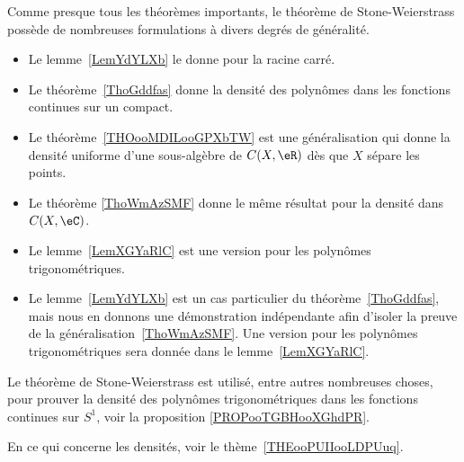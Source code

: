 Comme presque tous les théorèmes importants, le théorème de Stone-Weierstrass possède de nombreuses formulations à divers degrés de généralité.
\begin{itemize}
    \item Le lemme~\ref{LemYdYLXb} le donne pour la racine carré.
    \item Le théorème~\ref{ThoGddfas} donne la densité des polynômes dans les fonctions continues sur un compact.
    \item Le théorème~\ref{THOooMDILooGPXbTW} est une généralisation qui donne la densité uniforme d'une sous-algèbre de \( C(X,\eR)\) dès que \( X\) sépare les points.
    \item Le théorème \ref{ThoWmAzSMF} donne le même résultat pour la densité dans \( C(X,\eC)\).
    \item Le lemme~\ref{LemXGYaRlC} est une version pour les polynômes trigonométriques.
    \item
        Le lemme~\ref{LemYdYLXb} est un cas particulier du
        théorème~\ref{ThoGddfas}, mais nous en donnons une démonstration indépendante afin d'isoler la preuve
de la généralisation~\ref{ThoWmAzSMF}.
Une version pour les polynômes trigonométriques sera donnée dans le lemme~\ref{LemXGYaRlC}.
\end{itemize}
Le théorème de Stone-Weierstrass est utilisé, entre autres nombreuses choses, pour prouver la densité des polynômes trigonométriques dans les fonctions continues sur \( S^1\), voir la proposition \ref{PROPooTGBHooXGhdPR}.


                \label{THEMooNMYKooVVeGTU}

En ce qui concerne les densités, voir le thème~\ref{THEooPUIIooLDPUuq}.


